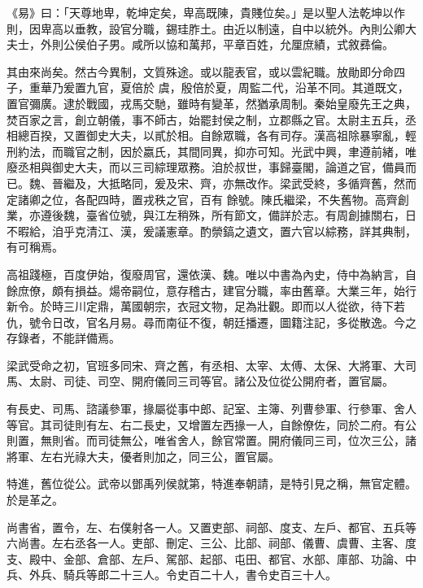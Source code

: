 
\begin{pinyinscope}

 《易》曰：「天尊地卑，乾坤定矣，卑高既陳，貴賤位矣。」是以聖人法乾坤以作則，因卑高以垂教，設官分職，錫珪胙土。由近以制遠，自中以統外。內則公卿大夫士，外則公侯伯子男。咸所以協和萬邦，平章百姓，允厘庶績，式敘彞倫。



 其由來尚矣。然古今異制，文質殊途。或以龍表官，或以雲紀職。放勛即分命四子，重華乃爰置九官，夏倍於
 虞，殷倍於夏，周監二代，沿革不同。其道既文，置官彌廣。逮於戰國，戎馬交馳，雖時有變革，然猶承周制。秦始皇廢先王之典，焚百家之言，創立朝儀，事不師古，始罷封侯之制，立郡縣之官。太尉主五兵，丞相總百揆，又置御史大夫，以貳於相。自餘眾職，各有司存。漢高祖除暴寧亂，輕刑約法，而職官之制，因於嬴氏，其間同異，抑亦可知。光武中興，聿遵前緒，唯廢丞相與御史大夫，而以三司綜理眾務。洎於叔世，事歸臺閣，論道之官，備員而已。魏、晉繼及，大抵略同，爰及宋、齊，亦無改作。梁武受終，多循齊舊，然而定諸卿之位，各配四時，置戎秩之官，百有
 餘號。陳氏繼梁，不失舊物。高齊創業，亦遵後魏，臺省位號，與江左稍殊，所有節文，備詳於志。有周創據關右，日不暇給，洎乎克清江、漢，爰議憲章。酌禜鎬之遺文，置六官以綜務，詳其典制，有可稱焉。



 高祖踐極，百度伊始，復廢周官，還依漢、魏。唯以中書為內史，侍中為納言，自餘庶僚，頗有損益。煬帝嗣位，意存稽古，建官分職，率由舊章。大業三年，始行新令。於時三川定鼎，萬國朝宗，衣冠文物，足為壯觀。即而以人從欲，待下若仇，號令日改，官名月易。尋而南征不復，朝廷播遷，圖籍注記，多從散逸。今之存錄者，不能詳備焉。



 梁武受命之初，官班多同宋、齊之舊，有丞相、太宰、太傅、太保、大將軍、大司馬、太尉、司徒、司空、開府儀同三司等官。諸公及位從公開府者，置官屬。



 有長史、司馬、諮議參軍，掾屬從事中郎、記室、主簿、列曹參軍、行參軍、舍人等官。其司徒則有左、右二長史，又增置左西掾一人，自餘僚佐，同於二府。有公則置，無則省。而司徒無公，唯省舍人，餘官常置。開府儀同三司，位次三公，諸將軍、左右光祿大夫，優者則加之，同三公，置官屬。



 特進，舊位從公。武帝以鄧禹列侯就第，特進奉朝請，是特引見之稱，無官定體。於是革之。



 尚書省，置令，左、右僕射各一人。又置吏部、祠部、度支、左戶、都官、五兵等六尚書。左右丞各一人。吏部、刪定、三公、比部、祠部、儀曹、虞曹、主客、度支、殿中、金部、倉部、左戶、駕部、起部、屯田、都官、水部、庫部、功論、中兵、外兵、騎兵等郎二十三人。令史百二十人，書令史百三十人。




\end{pinyinscope}
